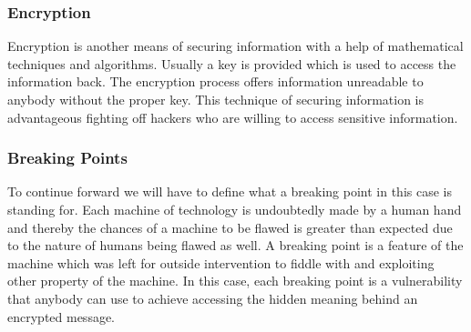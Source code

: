 \documentclass[conference,compsoc]{IEEEtran}
\begin{document}
\subsubsection{Encryption} Encryption is another means of securing information with a help of mathematical techniques and algorithms. Usually a key is provided which is used to access the information back. The encryption process offers information unreadable to anybody without the proper key. This technique of securing information is advantageous fighting off hackers who are willing to access sensitive information.\\

\subsubsection{Breaking Points} To continue forward we will have to define what a breaking point in this case is standing for. Each machine of technology is undoubtedly made by a human hand and thereby the chances of a machine to be flawed is greater than expected due to the nature of humans being flawed as well. A breaking point is a feature of the machine which was left for outside intervention to fiddle with and exploiting other property of the machine. In this case, each breaking point is a vulnerability that anybody can use to achieve accessing the hidden meaning behind an encrypted message.\\
\end{document}
